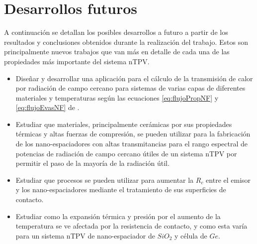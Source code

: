 \section{Desarrollos futuros}
A continuación se detallan los posibles desarrollos a futuro a partir de los resultados y conclusiones obtenidos durante la realización del trabajo. Estos son principalmente nuevos trabajos que van más en detalle de cada una de las propiedades más importante del sistema nTPV.
\begin{itemize}
	\item Diseñar y desarrollar una aplicación para el cálculo de la transmisión de calor por radiación de campo cercano para sistemas de varias capas de diferentes materiales y temperaturas según las ecuaciones \eqref{eq:flujoPropNF} y \eqref{eq:flujoEvasNF} de \cite{nfTPV_fullEquations}.
	\item Estudiar que materiales, principalmente cerámicas por sus propiedades térmicas y altas fuerzas de compresión, se pueden utilizar para la fabricación de los nano-espaciadores con altas transmitancias para el rango espectral de potencias de radiación de campo cercano útiles de un sistema nTPV por permitir el paso de la mayoría de la radiación útil.
	\item Estudiar que procesos se pueden utilizar para aumentar la $R_c$ entre el emisor y los nano-espaciadores mediante el tratamiento de sus superficies de contacto.
	\item Estudiar como la expansión térmica y presión por el aumento de la temperatura se ve afectada por la resistencia de contacto, y como esta varía para un sistema nTPV de nano-espaciador de $SiO_2$ y célula de $Ge$.	
\end{itemize}